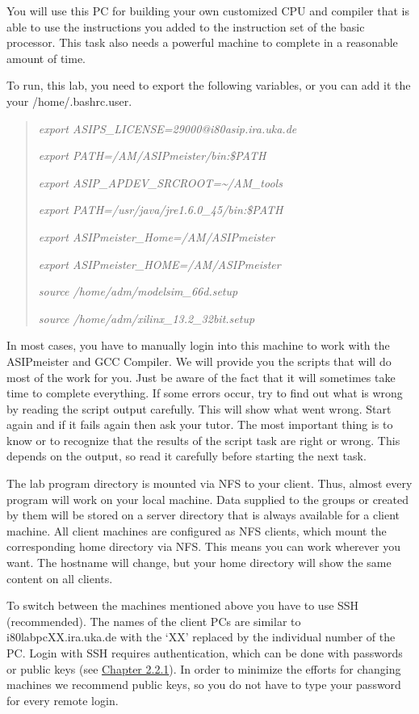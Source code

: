 \documentclass[
]{article}
\begin{document}
You will use this PC for building your own customized CPU and compiler
that is able to use the instructions you added to the instruction set of
the basic processor. This task also needs a powerful machine to complete
in a reasonable amount of time.

To run, this lab, you need to export the following variables, or you can
add it the your /home/.bashrc.user.

\begin{quote}
\emph{export ASIPS\_LICENSE=29000@i80asip.ira.uka.de}

\emph{export PATH=/AM/ASIPmeister/bin:\$PATH}

\emph{export ASIP\_APDEV\_SRCROOT=\textasciitilde/AM\_tools}

\emph{export PATH=/usr/java/jre1.6.0\_45/bin:\$PATH}

\emph{export ASIPmeister\_Home=/AM/ASIPmeister}

\emph{export ASIPmeister\_HOME=/AM/ASIPmeister}

\emph{source /home/adm/modelsim\_66d.setup}

\emph{source /home/adm/xilinx\_13.2\_32bit.setup}
\end{quote}

In most cases, you have to manually login into this machine to work with
the ASIPmeister and GCC Compiler. We will provide you the scripts that
will do most of the work for you. Just be aware of the fact that it will
sometimes take time to complete everything. If some errors occur, try to
find out what is wrong by reading the script output carefully. This will
show what went wrong. Start again and if it fails again then ask your
tutor. The most important thing is to know or to recognize that the
results of the script task are right or wrong. This depends on the
output, so read it carefully before starting the next task.

The lab program directory is mounted via NFS to your client. Thus,
almost every program will work on your local machine. Data supplied to
the groups or created by them will be stored on a server directory that
is always available for a client machine. All client machines are
configured as NFS clients, which mount the corresponding home directory
via NFS. This means you can work wherever you want. The hostname will
change, but your home directory will show the same content on all
clients.

To switch between the machines mentioned above you have to use SSH
(recommended). The names of the client PCs are similar to
i80labpcXX.ira.uka.de with the `XX' replaced by the individual number of
the PC. Login with SSH requires authentication, which can be done with
passwords or public keys (see
\protect\hyperlink{remote-operation}{Chapter 2.2.1}). In order to
minimize the efforts for changing machines we recommend public keys, so
you do not have to type your password for every remote login.
\end{document}
